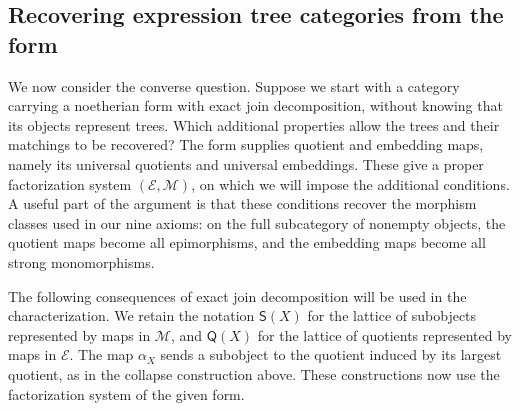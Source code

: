 \documentclass[11pt,a4paper]{article}
\theoremstyle{plain}
\theoremstyle{definition}
\theoremstyle{remark}
\begin{document}
\subsection{Recovering expression tree categories from the form}
\label{sec:tree-form-characterization}
We now consider the converse question. Suppose we start with a
category carrying a noetherian form with exact join decomposition,
without knowing that its objects represent trees. Which additional
properties allow the trees and their matchings to be recovered?
The form supplies quotient and embedding maps, namely its
universal quotients and universal embeddings. These give a proper
factorization system $(\mathcal E,\mathcal M)$, on which we
will impose the additional conditions. A useful part of the
argument is that these conditions recover the morphism classes
used in our nine axioms: on the full subcategory of nonempty
objects, the quotient maps become all epimorphisms, and the
embedding maps become all strong monomorphisms.

The following consequences of exact join decomposition will be
used in the characterization. We retain the notation
$\mathsf S(X)$ for the lattice of subobjects represented by
maps in $\mathcal M$, and $\mathsf Q(X)$ for the lattice of
quotients represented by maps in $\mathcal E$. The map $\alpha_X$
sends a subobject to the quotient induced by its largest quotient,
as in the collapse construction above. These constructions now
use the factorization system of the given form.
\end{document}
